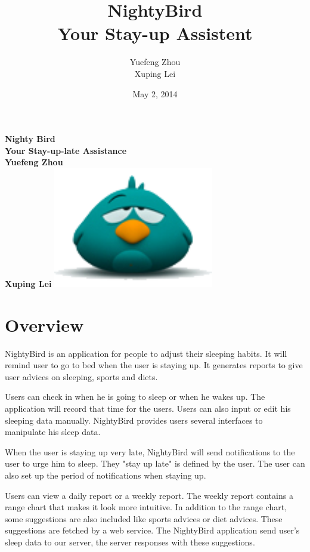 \documentclass[14pt]{extreport}
\begin{document}
\title{NightyBird\\Your Stay-up Assistent}
\doublespacing

\author{Yuefeng Zhou\\Xuping Lei}
\date{May 2, 2014}

\begin{titlepage}
    \centering
    \vfill
    {\bfseries\Large
        Nighty Bird\\
        Your Stay-up-late Assistance\\
        \vskip2cm
        Yuefeng Zhou\\
        Xuping Lei
    }    
    \vfill
    \includegraphics[width=7cm]{icon.png} %
    \vfill
    \vfill
\end{titlepage}

\chapter{Overview}
NightyBird is an application for people to adjust their sleeping habits. It will remind user to go to bed when the user is staying up. It generates reports to give user advices on sleeping, sports and diets.

Users can check in when he is going to sleep or when he wakes up. The application will record that time for the users. Users can also input or edit his sleeping data manually. NightyBird provides users several interfaces to manipulate his sleep data. 

When the user is staying up very late, NightyBird will send notifications to the user to urge him to sleep. They "stay up late" is defined by the user. The user can also set up the period of notifications when staying up.

Users can view a daily report or a weekly report. The weekly report contains a range chart that makes it look more intuitive. In addition to the range chart, some suggestions are also included like sports advices or diet advices. These suggestions are fetched by a web service. The NightyBird application send user's sleep data to our server, the server responses with these suggestions.
\end{document}

